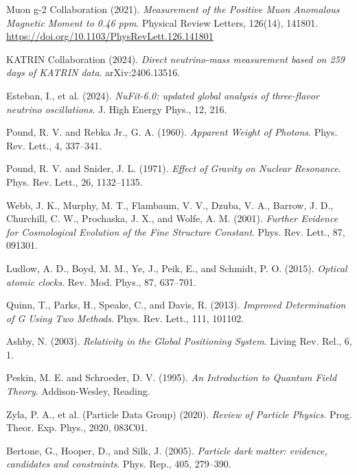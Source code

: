 \documentclass[12pt,a4paper]{article}
\theoremstyle{definition}
\begin{document}
\begin{thebibliography}{99}
		Muon g-2 Collaboration (2021). 
		\textit{Measurement of the Positive Muon Anomalous Magnetic Moment to 0.46 ppm}. 
		Physical Review Letters, 126(14), 141801. 
		\url{https://doi.org/10.1103/PhysRevLett.126.141801}
		
		KATRIN Collaboration (2024). 
		\textit{Direct neutrino-mass measurement based on 259 days of KATRIN data}. 
		arXiv:2406.13516.
		
		Esteban, I., et al. (2024). 
		\textit{NuFit-6.0: updated global analysis of three-flavor neutrino oscillations}. 
		J. High Energy Phys., 12, 216.
		
		Pound, R. V. and Rebka Jr., G. A. (1960).
		\textit{Apparent Weight of Photons}.
		Phys. Rev. Lett., 4, 337--341.
		
		Pound, R. V. and Snider, J. L. (1971). 
		\textit{Effect of Gravity on Nuclear Resonance}. 
		Phys. Rev. Lett., 26, 1132--1135.
		
		Webb, J. K., Murphy, M. T., Flambaum, V. V., Dzuba, V. A., Barrow, J. D., Churchill, C. W., Prochaska, J. X., and Wolfe, A. M. (2001). 
		\textit{Further Evidence for Cosmological Evolution of the Fine Structure Constant}. 
		Phys. Rev. Lett., 87, 091301.
		
		Ludlow, A. D., Boyd, M. M., Ye, J., Peik, E., and Schmidt, P. O. (2015). 
		\textit{Optical atomic clocks}. 
		Rev. Mod. Phys., 87, 637--701.
		
		Quinn, T., Parks, H., Speake, C., and Davis, R. (2013). 
		\textit{Improved Determination of G Using Two Methods}. 
		Phys. Rev. Lett., 111, 101102.
		
		Ashby, N. (2003). 
		\textit{Relativity in the Global Positioning System}. 
		Living Rev. Rel., 6, 1.
		
		Peskin, M. E. and Schroeder, D. V. (1995). 
		\textit{An Introduction to Quantum Field Theory}. 
		Addison-Wesley, Reading.
		
		Zyla, P. A., et al. (Particle Data Group) (2020). 
		\textit{Review of Particle Physics}. 
		Prog. Theor. Exp. Phys., 2020, 083C01.
		
		Bertone, G., Hooper, D., and Silk, J. (2005). 
		\textit{Particle dark matter: evidence, candidates and constraints}. 
		Phys. Rep., 405, 279--390.
		
	\end{thebibliography}
	
\end{document}
